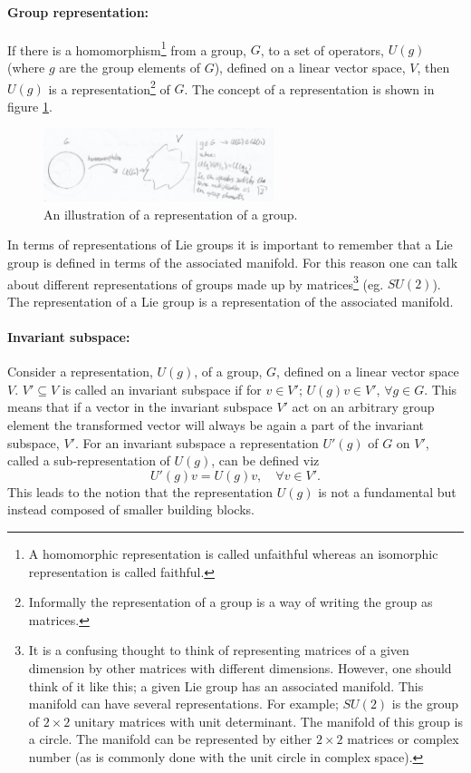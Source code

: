 \paragraph{Group representation: }
If there is a homomorphism\footnote{A homomorphic representation is called unfaithful whereas an isomorphic representation is called faithful.} from a group, $G$, to a set of operators, $U(g)$ (where $g$ are the group elements of $G$), defined on a linear vector space, $V$, then $U(g)$ is a representation\footnote{Informally the representation of a group is a way of writing the group as matrices.} of $G$. The concept of a representation is shown in figure \ref{fig:4}.
\begin{figure}[h]
	\captionsetup{width=1\textwidth}
	\centering
	\includegraphics[width=0.6\textwidth]{figures//4}
	\caption{An illustration of a representation of a group.}
	\label{fig:4}
\end{figure} 
In terms of representations of Lie groups it is important to remember that a Lie group is defined in terms of the associated manifold. For this reason one can talk about different representations of groups made up by matrices\footnote{It is a confusing thought to think of representing matrices of a given dimension by other matrices with different dimensions. However, one should think of it like this; a given Lie group has an associated manifold. This manifold can have several representations. For example; $SU(2)$ is the group of $2\times 2$ unitary matrices with unit determinant. The manifold of this group is a circle. The manifold can be represented by either $2\times 2$ matrices or complex number (as is commonly done with the unit circle in complex space).} (eg. $SU(2)$). The representation of a Lie group is a representation of the associated manifold.

\paragraph{Invariant subspace:} Consider a representation, $U(g)$, of a group, $G$, defined on a linear vector space $V$. $V'\subseteq V$ is called an invariant subspace if for $v\in V'$; $U(g)v\in V'$, $\forall g\in G$. This means that if a vector in the invariant subspace $V'$ act on an arbitrary group element the transformed vector will always be again a part of the invariant subspace, $V'$. For an invariant subspace a representation $U'(g)$ of $G$ on $V'$, called a sub-representation of $U(g)$, can be defined viz
\begin{equation}
	U'(g)v=U(g)v,\quad \forall v\in V'.
\end{equation} 
This leads to the notion that the representation $U(g)$ is not a fundamental but instead composed of smaller building blocks. 

